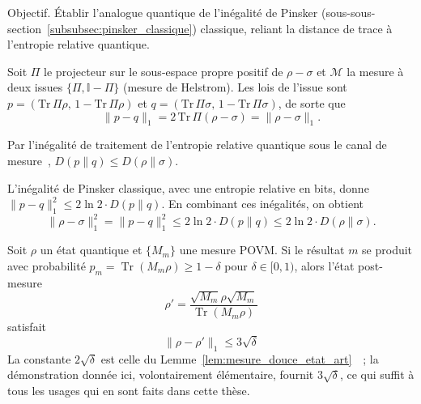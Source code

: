 \begin{sloppypar}
\begin{Preuve}\label{prv:pinsker_quantique}

\begin{cmtEtape}{Objectif.}
\'Etablir l'analogue quantique de l'in\'egalit\'e de Pinsker (sous-sous-section~\ref{subsubsec:pinsker_classique}) classique,
reliant la distance de trace \`a l'entropie relative quantique.
\end{cmtEtape}

Soit $\Pi$ le projecteur sur le sous-espace propre positif de
$\rho - \sigma$ et $\mathcal{M}$ la mesure \`a deux issues
$\{\Pi, \mathbb{I} - \Pi\}$ (mesure de Helstrom). Les lois de l'issue sont
$p = (\mathrm{Tr}\,\Pi\rho,\, 1 - \mathrm{Tr}\,\Pi\rho)$ et
$q = (\mathrm{Tr}\,\Pi\sigma,\, 1 - \mathrm{Tr}\,\Pi\sigma)$, de sorte que
\begin{equation}
\|p - q\|_1 = 2\,\mathrm{Tr}\,\Pi(\rho-\sigma) = \|\rho - \sigma\|_1 .
\end{equation}

Par l'in\'egalit\'e de traitement de l'entropie relative quantique sous le
canal de mesure~\cite{Wilde2017}, $D(p\|q) \leq D(\rho\|\sigma)$.

L'in\'egalit\'e de Pinsker classique, avec une entropie relative en bits,
donne $\|p - q\|_1^2 \leq 2\ln 2 \cdot D(p\|q)$. En combinant ces in\'egalit\'es, on obtient
\begin{equation}
\|\rho - \sigma\|_1^2 = \|p - q\|_1^2 \leq 2 \ln 2 \cdot D(p\|q) \leq 2\ln 2 \cdot D(\rho\|\sigma).
\end{equation}
\end{Preuve}

\begin{lemma}\label{lem:mesure_douce}
Soit $\rho$ un \'etat quantique et $\{M_m\}$ une mesure POVM. Si le r\'esultat
$m$ se produit avec probabilit\'e $p_m = \operatorname{Tr}(M_m \rho) \geq 1 - \delta$
pour $\delta \in [0, 1)$, alors l'\'etat post-mesure
\begin{equation}
\rho' = \frac{\sqrt{M_m}\rho\sqrt{M_m}}{\operatorname{Tr}(M_m\rho)}
\end{equation}
satisfait
\begin{equation}
\|\rho - \rho'\|_1 \leq 3\sqrt{\delta}
\end{equation}
La constante $2\sqrt{\delta}$ est celle du
Lemme~\ref{lem:mesure_douce_etat_art}~\cite{Winter,OgawaNagaoka}~; la d\'emonstration donn\'ee ici,
volontairement \'el\'ementaire, fournit $3\sqrt{\delta}$, ce qui suffit
\`a tous les usages qui en sont faits dans cette th\`ese.
\end{lemma}


\end{sloppypar}

